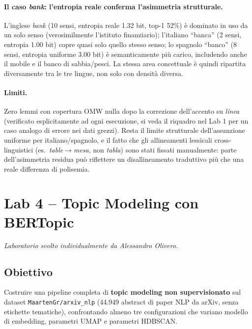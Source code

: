 \documentclass[12pt,a4paper]{article}
\begin{document}
\paragraph{Il caso \textit{bank}: l'entropia reale conferma l'asimmetria strutturale.} L'inglese \textit{bank} (10 sensi, entropia reale 1.32 bit, top-1 52\%) \`e dominato in uso da un solo senso (verosimilmente l'istituto finanziario); l'italiano ``banca'' (2 sensi, entropia 1.00 bit) copre quasi solo quello stesso senso; lo spagnolo ``banco'' (8 sensi, entropia uniforme 3.00 bit) \`e semanticamente pi\`u carico, includendo anche il mobile e il banco di sabbia/pesci. La stessa area concettuale \`e quindi ripartita diversamente tra le tre lingue, non solo con densit\`a diversa.

\paragraph{Limiti.} Zero lemmi con copertura OMW nulla dopo la correzione dell'accento su \textit{l\'inea} (verificato esplicitamente ad ogni esecuzione, si veda il riquadro nel Lab 1 per un caso analogo di errore nei dati grezzi). Resta il limite strutturale dell'assunzione uniforme per italiano/spagnolo, e il fatto che gli allineamenti lessicali cross-linguistici (es.\ \textit{table}$\to$\textit{mesa}, non \textit{tabla}) sono stati fissati manualmente: parte dell'asimmetria residua pu\`o riflettere un disallineamento traduttivo pi\`u che una reale differenza di polisemia.

\section{Lab 4 -- Topic Modeling con BERTopic}

\textit{Laboratorio svolto individualmente da Alessandro Olivero.}

\subsection{Obiettivo}

Costruire una pipeline completa di \textbf{topic modeling non supervisionato} sul dataset \texttt{MaartenGr/arxiv\_nlp} (44.949 abstract di paper NLP da arXiv, senza etichette tematiche), confrontando almeno tre configurazioni che variano modello di embedding, parametri UMAP e parametri HDBSCAN.
\end{document}
